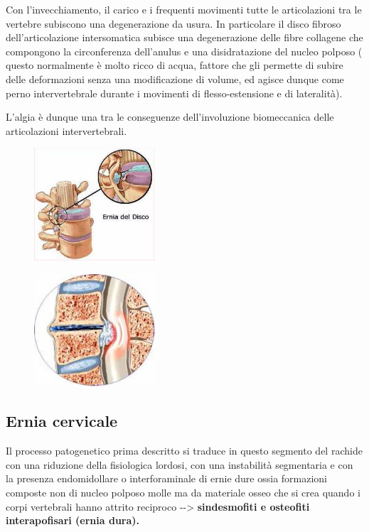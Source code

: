 Con l'invecchiamento, il carico e i frequenti movimenti tutte le articolazioni tra le vertebre subiscono una degenerazione da usura. In particolare il disco fibroso dell'articolazione intersomatica subisce una degenerazione delle fibre collagene che compongono la circonferenza dell'anulus e una disidratazione del nucleo polposo ( questo normalmente è molto ricco di acqua, fattore che gli permette di subire delle deformazioni senza una modificazione di volume, ed agisce dunque come
perno intervertebrale durante i movimenti di flesso-estensione e di lateralità).

L'algia è dunque una tra le conseguenze dell'involuzione biomeccanica delle articolazioni intervertebrali.

\begin{figure}[!ht]
\centering
\includegraphics[width=0.4\textwidth]{020/image2.png}
\end{figure}

\begin{figure}[!ht]
\centering
\includegraphics[width=0.4\textwidth]{020/image3.png}
\end{figure}

\subsection{Ernia cervicale}

Il processo patogenetico prima descritto si traduce in questo segmento del rachide con una riduzione della fisiologica lordosi, con una instabilità segmentaria e con la presenza endomidollare o interforaminale di ernie dure ossia formazioni composte non di nucleo polposo molle ma da materiale osseo che si crea quando i corpi
vertebrali hanno attrito reciproco -\/-\textgreater{}
\textbf{sindesmofiti e osteofiti interapofisari (ernia dura).}

